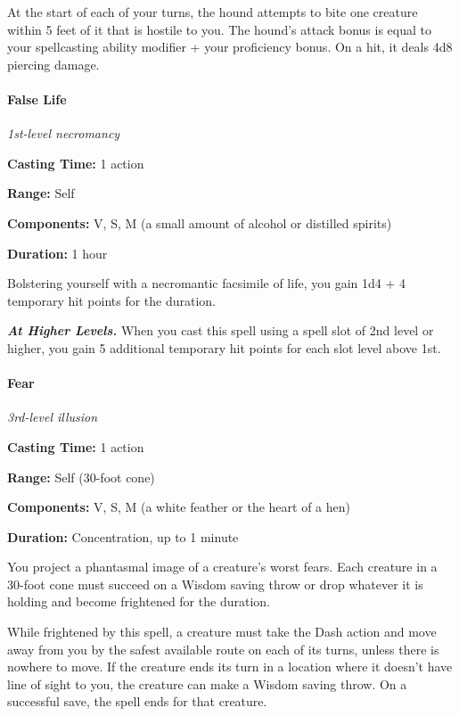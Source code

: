 \documentclass[
]{article}
\begin{document}
At the start of each of your turns, the hound attempts to bite one
creature within 5 feet of it that is hostile to you. The hound's attack
bonus is equal to your spellcasting ability modifier + your proficiency
bonus. On a hit, it deals 4d8 piercing damage.

\hypertarget{false-life}{%
\paragraph{False Life}\label{false-life}}

\emph{1st-level necromancy}

\textbf{Casting Time:} 1 action

\textbf{Range:} Self

\textbf{Components:} V, S, M (a small amount of alcohol or distilled
spirits)

\textbf{Duration:} 1 hour

Bolstering yourself with a necromantic facsimile of life, you gain 1d4 +
4 temporary hit points for the duration.

\emph{\textbf{At Higher Levels.}} When you cast this spell using a spell
slot of 2nd level or higher, you gain 5 additional temporary hit points
for each slot level above 1st.

\hypertarget{fear}{%
\paragraph{Fear}\label{fear}}

\emph{3rd-level illusion}

\textbf{Casting Time:} 1 action

\textbf{Range:} Self (30-foot cone)

\textbf{Components:} V, S, M (a white feather or the heart of a hen)

\textbf{Duration:} Concentration, up to 1 minute

You project a phantasmal image of a creature's worst fears. Each
creature in a 30-foot cone must succeed on a Wisdom saving throw or drop
whatever it is holding and become frightened for the duration.

While frightened by this spell, a creature must take the Dash action and
move away from you by the safest available route on each of its turns,
unless there is nowhere to move. If the creature ends its turn in a
location where it doesn't have line of sight to you, the creature can
make a Wisdom saving throw. On a successful save, the spell ends for
that creature.
\end{document}
